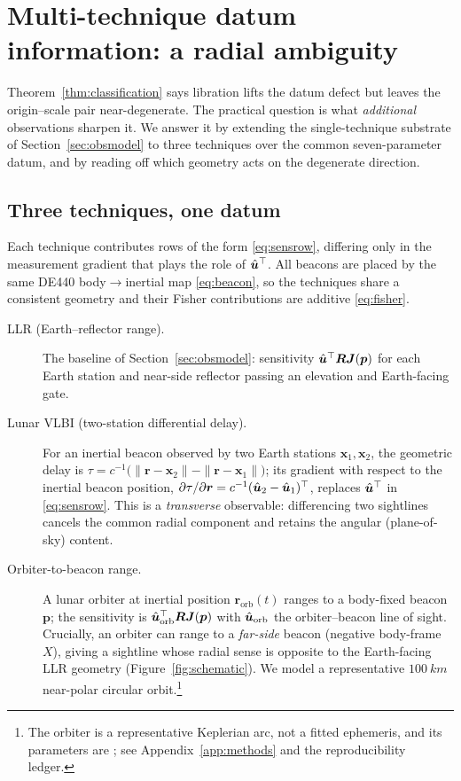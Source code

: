 \section{Multi-technique datum information: a radial ambiguity}
\label{sec:multitechnique}

Theorem~\ref{thm:classification} says libration lifts the datum defect but leaves
the origin--scale pair near-degenerate. The practical question is what
\emph{additional} observations sharpen it. We answer it by extending the
single-technique substrate of Section~\ref{sec:obsmodel} to three techniques over
the common seven-parameter datum, and by reading off which geometry acts on the
degenerate direction.

\subsection{Three techniques, one datum}
\label{sec:threetech}

Each technique contributes rows of the form \eqref{eq:sensrow}, differing only in
the measurement gradient that plays the role of $\hat{\bm{u}}^\top$. All beacons are
placed by the same DE440 body$\rightarrow$inertial map \eqref{eq:beacon}, so the
techniques share a consistent geometry and their Fisher contributions are additive
\eqref{eq:fisher}.

\begin{description}
  \item[LLR (Earth--reflector range).] The baseline of
  Section~\ref{sec:obsmodel}: sensitivity $\hat{\bm{u}}^\top\bm{R}\bm{J}(\bm{p})$ for each
  Earth station and near-side reflector passing an elevation and Earth-facing gate.

  \item[Lunar VLBI (two-station differential delay).] For an inertial beacon
  observed by two Earth stations $\bm{x}_1,\bm{x}_2$, the geometric delay is
  $\tau = c^{-1}\bigl(\|\bm{r}-\bm{x}_2\|-\|\bm{r}-\bm{x}_1\|\bigr)$; its gradient
  with respect to the inertial beacon position,
  $\partial\tau/\partial\bm{r}=c^{-1}(\hat{\bm{u}}_2-\hat{\bm{u}}_1)^\top$, replaces $\hat{\bm{u}}^\top$
  in \eqref{eq:sensrow}. This is a \emph{transverse} observable: differencing two
  sightlines cancels the common radial component and retains the angular
  (plane-of-sky) content.

  \item[Orbiter-to-beacon range.] A lunar orbiter at inertial position
  $\bm{r}_{\mathrm{orb}}(t)$ ranges to a body-fixed beacon $\bm{p}$; the
  sensitivity is $\hat{\bm{u}}_{\mathrm{orb}}^\top\bm{R}\bm{J}(\bm{p})$ with
  $\hat{\bm{u}}_{\mathrm{orb}}$ the orbiter--beacon line of sight. Crucially, an orbiter
  can range to a \emph{far-side} beacon (negative body-frame $X$), giving a
  sightline whose radial sense is opposite to the Earth-facing LLR geometry
  (Figure~\ref{fig:schematic}). We model a representative $\SI{100}{km}$ near-polar
  circular orbit.\footnote{The orbiter is a representative Keplerian arc, not a
  fitted ephemeris, and its parameters are \Modelled{}; see
  Appendix~\ref{app:methods} and the reproducibility ledger.}
\end{description}

